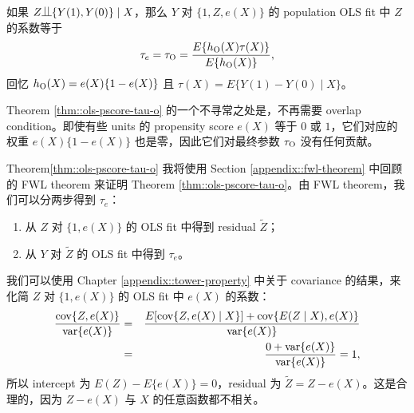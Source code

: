\begin{theorem}\label{thm::ols-pscore-tau-o}
如果 $Z\ind \{  Y(1), Y(0) \} \mid X$，那么 $Y$ 对 $\{1, Z, e(X)\}$ 的 population OLS fit 中 $Z$ 的系数等于
$$
\tau_e=  \tau_\textsc{O} = \frac{  E\{ h_\textsc{O}(X) \tau(X) \} }{ E\{ h_\textsc{O}(X) \} },
$$
回忆 $ h_\textsc{O}(X)  = e(X) \{ 1- e(X)  \} $ 且 $\tau(X) = E\{ Y(1) - Y(0) \mid X  \}$。
\end{theorem}


Theorem \ref{thm::ols-pscore-tau-o} 的一个不寻常之处是，不再需要 overlap condition。即使有些 units 的 propensity score $e(X)$ 等于 $0$ 或 $1$，它们对应的权重 $ e(X) \{ 1- e(X) \}$ 也是零，因此它们对最终参数 $ \tau_\textsc{O} $ 没有任何贡献。


\begin{myproof}{Theorem}{\ref{thm::ols-pscore-tau-o}}
我将使用 Section \ref{appendix::fwl-theorem} 中回顾的 FWL theorem 来证明 Theorem \ref{thm::ols-pscore-tau-o}。由 FWL theorem，我们可以分两步得到 $\tau_e$：
\begin{enumerate}
\item
从 $Z$ 对 $\{1, e(X)\}$ 的 OLS fit 中得到 residual $\tilde{Z}$；
\item
从 $Y$ 对 $\tilde{Z}$ 的 OLS fit 中得到 $\tau_e$。
\end{enumerate}


我们可以使用 Chapter \ref{appendix::tower-property} 中关于 covariance 的结果，来化简 $Z$ 对 $\{1, e(X)\}$ 的 OLS fit 中 $e(X)$ 的系数：
\begin{eqnarray*}
\frac{ \textup{cov}\{Z, e(X)  \}  }{  \textup{var}\{ e(X) \} }
&=&  \frac{  E [ \textup{cov}\{Z, e(X)  \mid X\}  ] + \textup{cov}\{  E(Z\mid X), e(X) \}   }{  \textup{var}\{ e(X) \}  } \\
&=& \frac{0 +\textup{var}\{ e(X) \}  }{ \textup{var}\{ e(X) \} } = 1,
\end{eqnarray*}
所以 intercept 为 $E(Z) - E\{e(X)\} = 0$，residual 为 $\tilde{Z} = Z - e(X)$。这是合理的，因为 $Z - e(X)$ 与 $X$ 的任意函数都不相关。


\end{myproof}
